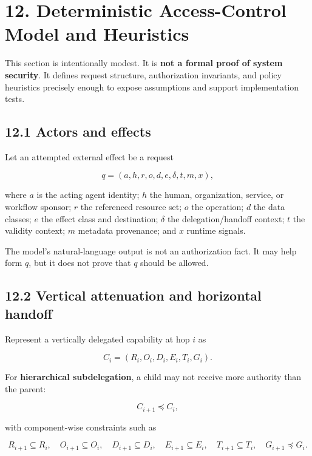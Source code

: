 \documentclass[
  10pt,
  letterpaper,
]{article}
\begin{document}
\section{12. Deterministic Access-Control Model and
Heuristics}\label{deterministic-access-control-model-and-heuristics}

This section is intentionally modest. It is \textbf{not a formal proof
of system security}. It defines request structure, authorization
invariants, and policy heuristics precisely enough to expose assumptions
and support implementation tests.

\subsection{12.1 Actors and effects}\label{actors-and-effects}

Let an attempted external effect be a request

\[
q = (a, h, r, o, d, e, \delta, t, m, x),
\]

where \(a\) is the acting agent identity; \(h\) the human, organization,
service, or workflow sponsor; \(r\) the referenced resource set; \(o\)
the operation; \(d\) the data classes; \(e\) the effect class and
destination; \(\delta\) the delegation/handoff context; \(t\) the
validity context; \(m\) metadata provenance; and \(x\) runtime signals.

The model's natural-language output is not an authorization fact. It may
help form \(q\), but it does not prove that \(q\) should be allowed.

\subsection{12.2 Vertical attenuation and horizontal
handoff}\label{vertical-attenuation-and-horizontal-handoff}

Represent a vertically delegated capability at hop \(i\) as

\[
C_i = (R_i, O_i, D_i, E_i, T_i, G_i).
\]

For \textbf{hierarchical subdelegation}, a child may not receive more
authority than the parent:

\[
C_{i+1}\preceq C_i,
\]

with component-wise constraints such as

\[
R_{i+1}\subseteq R_i,\quad O_{i+1}\subseteq O_i,\quad D_{i+1}\subseteq D_i,\quad
E_{i+1}\subseteq E_i,\quad T_{i+1}\subseteq T_i,\quad G_{i+1}\preceq G_i.
\]
\end{document}
